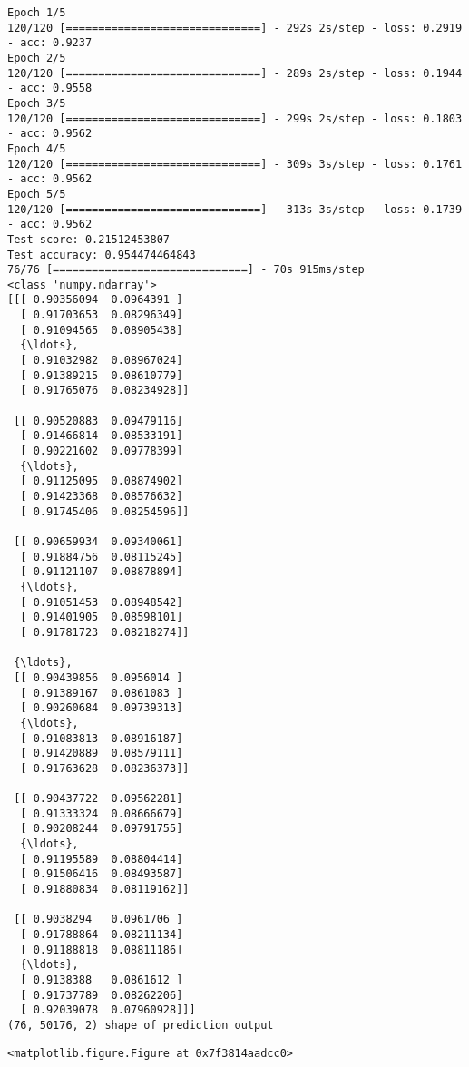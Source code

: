 \documentclass[11pt]{article}
\begin{document}
    \begin{Verbatim}[commandchars=\\\{\}]
Epoch 1/5
120/120 [==============================] - 292s 2s/step - loss: 0.2919 - acc: 0.9237
Epoch 2/5
120/120 [==============================] - 289s 2s/step - loss: 0.1944 - acc: 0.9558
Epoch 3/5
120/120 [==============================] - 299s 2s/step - loss: 0.1803 - acc: 0.9562
Epoch 4/5
120/120 [==============================] - 309s 3s/step - loss: 0.1761 - acc: 0.9562
Epoch 5/5
120/120 [==============================] - 313s 3s/step - loss: 0.1739 - acc: 0.9562
Test score: 0.21512453807
Test accuracy: 0.954474464843
76/76 [==============================] - 70s 915ms/step
<class 'numpy.ndarray'>
[[[ 0.90356094  0.0964391 ]
  [ 0.91703653  0.08296349]
  [ 0.91094565  0.08905438]
  {\ldots}, 
  [ 0.91032982  0.08967024]
  [ 0.91389215  0.08610779]
  [ 0.91765076  0.08234928]]

 [[ 0.90520883  0.09479116]
  [ 0.91466814  0.08533191]
  [ 0.90221602  0.09778399]
  {\ldots}, 
  [ 0.91125095  0.08874902]
  [ 0.91423368  0.08576632]
  [ 0.91745406  0.08254596]]

 [[ 0.90659934  0.09340061]
  [ 0.91884756  0.08115245]
  [ 0.91121107  0.08878894]
  {\ldots}, 
  [ 0.91051453  0.08948542]
  [ 0.91401905  0.08598101]
  [ 0.91781723  0.08218274]]

 {\ldots}, 
 [[ 0.90439856  0.0956014 ]
  [ 0.91389167  0.0861083 ]
  [ 0.90260684  0.09739313]
  {\ldots}, 
  [ 0.91083813  0.08916187]
  [ 0.91420889  0.08579111]
  [ 0.91763628  0.08236373]]

 [[ 0.90437722  0.09562281]
  [ 0.91333324  0.08666679]
  [ 0.90208244  0.09791755]
  {\ldots}, 
  [ 0.91195589  0.08804414]
  [ 0.91506416  0.08493587]
  [ 0.91880834  0.08119162]]

 [[ 0.9038294   0.0961706 ]
  [ 0.91788864  0.08211134]
  [ 0.91188818  0.08811186]
  {\ldots}, 
  [ 0.9138388   0.0861612 ]
  [ 0.91737789  0.08262206]
  [ 0.92039078  0.07960928]]]
(76, 50176, 2) shape of prediction output

    \end{Verbatim}

    
    \begin{verbatim}
<matplotlib.figure.Figure at 0x7f3814aadcc0>
    \end{verbatim}
\end{document}
